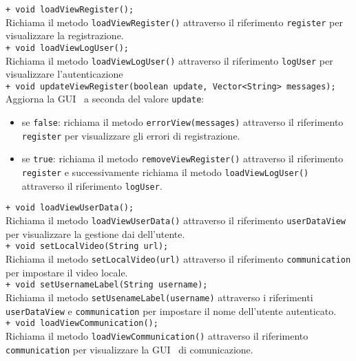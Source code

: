 {\begin{sloppypar}
{\begin{itemize}
\begin{itemize}
			\texttt{+ void loadViewRegister();}\\
			Richiama il metodo \texttt{loadViewRegister()} attraverso il riferimento \texttt{register} per visualizzare la registrazione.\\

			\texttt{+ void loadViewLogUser();}\\
			Richiama il metodo \texttt{loadViewLogUser()} attraverso il riferimento \texttt{logUser} per visualizzare l’autenticazione\\

			\texttt{+ void updateViewRegister(boolean update, Vector<String> messages);}\\
			Aggiorna la GUI\g~ a seconda del valore \texttt{update}:
			\begin{itemize}
				\item se \texttt{false}: richiama il metodo \texttt{errorView(messages)} attraverso il riferimento \texttt{register} per visualizzare gli errori di registrazione.
				\item se \texttt{true}: richiama il metodo \texttt{removeViewRegister()} attraverso il riferimento \texttt{register} e successivamente richiama il metodo \texttt{loadViewLogUser()} attraverso il riferimento \texttt{logUser}.\\
			\end{itemize}

			\texttt{+ void loadViewUserData();}\\
			Richiama il metodo \texttt{loadViewUserData()} attraverso il riferimento \texttt{userDataView} per visualizzare la gestione dai dell’utente.\\

			\texttt{+ void setLocalVideo(String url);}\\
			Richiama il metodo \texttt{setLocalVideo(url)} attraverso il riferimento \texttt{communication} per impostare il video locale.\\

			\texttt{+ void setUsernameLabel(String username);}\\
			Richiama il metodo \texttt{setUsenameLabel(username)} attraverso i riferimenti \texttt{userDataView} e \texttt{communication} per impostare il nome dell’utente autenticato.\\

			\texttt{+ void loadViewCommunication();}\\
			Richiama il metodo \texttt{loadViewCommunication()} attraverso il riferimento \texttt{communication} per visualizzare la GUI\g~ di comunicazione.\\


\end{itemize}
\end{itemize}}
\end{sloppypar}}
